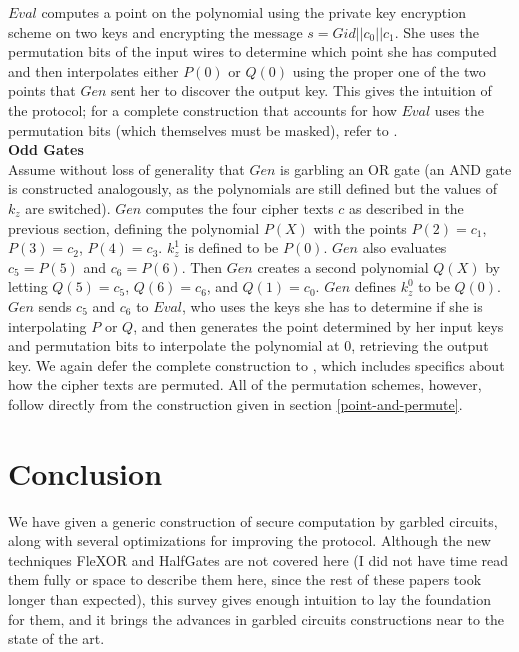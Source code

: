 \documentclass{article}
\begin{document}
$Eval$ computes a point on the polynomial using the private key encryption scheme on two keys and encrypting the message $s = Gid || c_0 || c_1$. She uses the permutation bits of the input wires to determine which point she has computed and then interpolates either $P(0)$ or $Q(0)$ using the proper one of the two points that $Gen$ sent her to discover the output key. This gives the intuition of the protocol; for a complete construction that accounts for how $Eval$ uses the permutation bits (which themselves must be masked), refer to \cite{GRR}. \\

\textbf{Odd Gates}\\
Assume without loss of generality that $Gen$ is garbling an OR gate (an AND gate is constructed analogously, as the polynomials are still defined but the values of $k_z$ are switched).
$Gen$ computes the four cipher texts $c$ as described in the previous section, defining the polynomial $P(X)$ with the points $P(2) = c_1$, $P(3) = c_2$, $P(4) = c_3$. $k_z^1$ is defined to be $P(0)$. $Gen$ also evaluates $c_5 = P(5)$ and $c_6 = P(6)$. Then $Gen$ creates a second polynomial $Q(X)$ by letting $Q(5) = c_5$, $Q(6) = c_6$, and $Q(1) = c_0$. $Gen$ defines $k_z^0$ to be $Q(0)$. \\

$Gen$ sends $c_5$ and $c_6$ to $Eval$, who uses the keys she has to determine if she is interpolating $P$ or $Q$, and then generates the point determined by her input keys and permutation bits to interpolate the polynomial at 0, retrieving the output key. We again defer the complete construction to \cite{GRR}, which includes specifics about how the cipher texts are permuted. All of the permutation schemes, however, follow directly from the construction given in section \ref{point-and-permute}.

\section{Conclusion}
We have given a generic construction of secure computation by garbled circuits, along with several optimizations for improving the protocol. Although the new techniques FleXOR \cite{flexor} and HalfGates \cite{halfgates} are not covered here (I did not have time read them fully or space to describe them here, since the rest of these papers took longer than expected), this survey gives enough intuition to lay the foundation for them, and it brings the advances in garbled circuits constructions near to the state of the art. 



\end{document}
